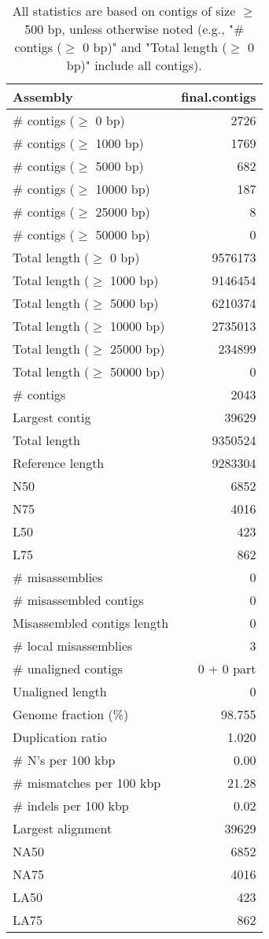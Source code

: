 \documentclass[12pt,a4paper]{article}
\begin{document}
\begin{table}[ht]
\begin{center}
\caption{All statistics are based on contigs of size $\geq$ 500 bp, unless otherwise noted (e.g., "\# contigs ($\geq$ 0 bp)" and "Total length ($\geq$ 0 bp)" include all contigs).}
\begin{tabular}{|l*{1}{|r}|}
\hline
Assembly & final.contigs \\ \hline
\# contigs ($\geq$ 0 bp) & 2726 \\ \hline
\# contigs ($\geq$ 1000 bp) & 1769 \\ \hline
\# contigs ($\geq$ 5000 bp) & 682 \\ \hline
\# contigs ($\geq$ 10000 bp) & 187 \\ \hline
\# contigs ($\geq$ 25000 bp) & 8 \\ \hline
\# contigs ($\geq$ 50000 bp) & 0 \\ \hline
Total length ($\geq$ 0 bp) & 9576173 \\ \hline
Total length ($\geq$ 1000 bp) & 9146454 \\ \hline
Total length ($\geq$ 5000 bp) & 6210374 \\ \hline
Total length ($\geq$ 10000 bp) & 2735013 \\ \hline
Total length ($\geq$ 25000 bp) & 234899 \\ \hline
Total length ($\geq$ 50000 bp) & 0 \\ \hline
\# contigs & 2043 \\ \hline
Largest contig & 39629 \\ \hline
Total length & 9350524 \\ \hline
Reference length & 9283304 \\ \hline
N50 & 6852 \\ \hline
N75 & 4016 \\ \hline
L50 & 423 \\ \hline
L75 & 862 \\ \hline
\# misassemblies & 0 \\ \hline
\# misassembled contigs & 0 \\ \hline
Misassembled contigs length & 0 \\ \hline
\# local misassemblies & 3 \\ \hline
\# unaligned contigs & 0 + 0 part \\ \hline
Unaligned length & 0 \\ \hline
Genome fraction (\%) & 98.755 \\ \hline
Duplication ratio & 1.020 \\ \hline
\# N's per 100 kbp & 0.00 \\ \hline
\# mismatches per 100 kbp & 21.28 \\ \hline
\# indels per 100 kbp & 0.02 \\ \hline
Largest alignment & 39629 \\ \hline
NA50 & 6852 \\ \hline
NA75 & 4016 \\ \hline
LA50 & 423 \\ \hline
LA75 & 862 \\ \hline
\end{tabular}
\end{center}
\end{table}
\end{document}
